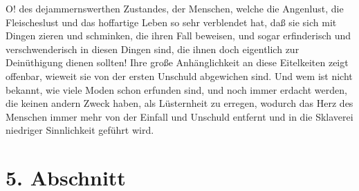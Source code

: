 O! des dejammernswerthen Zustandes, der Menschen, welche die Angenlust, die
Fleischeslust und das hoffartige Leben so sehr verblendet hat, daß sie sich mit
Dingen zieren und schminken, die ihren Fall beweisen, und sogar erfinderisch und
verschwenderisch in diesen Dingen sind, die ihnen doch eigentlich zur
Deinüthigung dienen sollten! Ihre große Anhänglichkeit an diese Eitelkeiten
zeigt offenbar, wieweit sie von der ersten Unschuld abgewichen sind. Und wem ist
nicht bekannt, wie viele Moden schon erfunden sind, und noch immer erdacht
werden, die keinen andern Zweck haben, als Lüsternheit zu erregen, wodurch das
Herz des Menschen immer mehr von der Einfall und Unschuld entfernt und in die
Sklaverei niedriger Sinnlichkeit geführt wird.

\section{5. Abschnitt} \label{kap14_ab5}

